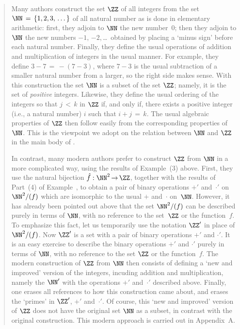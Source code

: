 {\begin{quotation}
{        Many authors construct the set ${\ZZ}$ of all integers from the set ${\NN} \,=\, \{1, 2, 3, \,{\ldots}\,\}$
    of all natural number as is done in elementary arithmetic: first, they adjoin to ${\NN}$ the new number~$0$;
    then they adjoin to ${\NN}$ the new numbers $-1$, $-2$,\,{\ldots}\, obtained by placing a `minus sign' before each natural number.
    Finally, they define the usual operations of addition and multiplication of integers in the usual manner.
    For example, they define $3 - 7 \,=\, -(7 - 3)$, where $7 - 3$ is the usual subtraction of a smaller natural number from a larger,
    so the right side makes sense. With this construction the set ${\NN}$ is a subset of the set ${\ZZ}$; namely, it is the set of {\em positive} integers.
    Likewise, they define the usual ordering of the integers so that $j\,<\,k$ in ${\ZZ}$ if, and only if,
    there exists a positive integer (i.e., a natural number) $i$ such that $i+j \,=\, k$.
    The usual algebraic properties of ${\ZZ}$ then follow easily from the corresponding properties of~${\NN}$.
    This is the viewpoint we adopt on the relation between ${\NN}$ and ${\ZZ}$ in the main body of {\ThisText}.


        In contrast, many modern authors prefer to construct ${\ZZ}$ from ${\NN}$ in a more complicated way, using the results of Example~(3) above.
    First, they use the natural bijection $\hat{f}:{\NN}^{2} \,{\rightarrow}\, {\ZZ}$, together with the results of Part~(4) of Example~,
    to obtain a pair of binary operations $+'$ and~${{\cdot}'}$ on ${\NN}^{    2}/(f)$ which are isomorphic to the usual $+$ and~${\cdot}$ on~${\NN}$.
    However, it has already been pointed out above that the set ${\NN}^{2}/(f)$ can be described purely in terms of ${\NN}$,
    with no reference to the set~${\ZZ}$ or the function~$f$. To emphasize this fact, let us temporarily use the notation ${\ZZ}'$ in place of ${\NN}^{2}/(f)$.
    Now ${\ZZ}'$ is a set with a pair of binary operations $+'$ and ${\cdot}'$. It is an easy exercise to describe the binary operations $+'$ and ${\cdot}'$
    purely in terms of ${\NN}$, with no reference to the set ${\ZZ}$ or the function~$f$.
    The modern construction of ${\ZZ}$ from ${\NN}$ then consists of defining a `new and improved' version of the integers,
    incuding addition and multiplication, namely the ${\NN}'$ with the operations $+'$ and~${\cdot}'$ described above.
    Finally, one erases all references to how this construction came about, and erases the `primes' in ${\ZZ}'$, $+'$ and~${\cdot}'$.
    Of course, this `new and improved' version of ${\ZZ}$ does not have the original set ${\NN}$ as a subset, in contrast with the original construction.
    This modern approach is carried out in Appendix~A.
}%
\end{quotation}

}%


